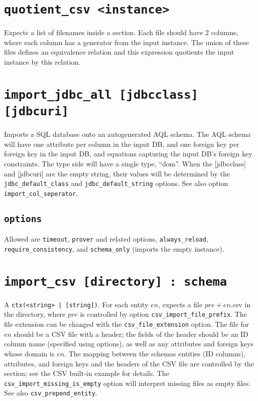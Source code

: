 \documentclass[10pt]{book}
\begin{document}
\section{{\tt quotient\_csv <instance>}}
Expects a list of filenames inside a section.  Each file should have 2 columns, where each column has a generator from the input instance.  The union of these files defines an equivalence relation and this expression quotients the input instance by this relation. 

\section{{\tt import\_jdbc\_all [jdbcclass] [jdbcuri]}}

Imports a SQL database onto an autogenerated AQL schema.  The AQL schema will have one attribute per column in the input DB, and one foreign key per foreign key in the input DB, and equations capturing the input DB's foreign key constraints.  The type side will have a single type, ``dom''.  When the [jdbcclass] and [jdbcuri] are the empty string, their values will be determined by the {\tt jdbc\_default\_class} and {\tt jdbc\_default\_string} options.  See also option {\tt import\_col\_seperator}.

\subsection{{\tt options}}
Allowed are {\tt timeout}, {\tt prover} and related options, {\tt always\_reload}, {\tt require\_consistency}, and {\tt schema\_only} (imports the empty instance).

\section{{\tt import\_csv [directory] : schema}}
A {\tt ctx(<string> | [string])}.  For each entity $en$, expects a file $pre + en$.csv in the directory, where $pre$ is controlled by option {\tt csv\_import\_file\_prefix}.  The file extension can be changed with the {\tt csv\_file\_extension} option.  The file for $en$ should be a CSV file with a header; the fields of the header should be an ID column name (specified using options), as well as any attributes and foreign keys whose domain is $en$.  The mapping between the schemas entities (ID columns), attributes, and foreign keys and the headers of the CSV file are controlled by the section; see the CSV built-in example for details.  The {\tt csv\_import\_missing\_is\_empty} option will interpret missing files as empty files.  See also {\tt csv\_prepend\_entity}. 
\end{document}
